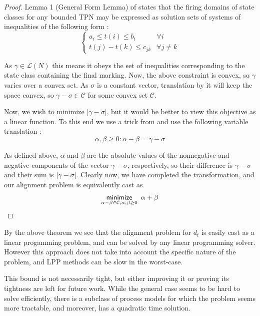 \documentclass[conference]{IEEEtran}
\newcounter{cases}
\begin{document}
\begin{proof}
		Lemma 1 (General Form Lemma) of \cite{berthomieu1982state} states that the firing domains of state classes for any bounded TPN may be expressed as solution sets of systems of inequalities of the following form :  $$\begin{cases}
			a_i \leq t(i) \leq b_i & \forall i \\ 
			t(j) - t(k) \leq c_{jk} & \forall j \neq k
		\end{cases}$$
		
		As $\gamma \in \mathcal{L}(N)$  this means it obeys the set of inequalities corresponding to the state class containing the final marking. Now, the above constraint is convex, so $\gamma$ varies over a convex set. As $\sigma$ is a constant vector, translation by it will keep the space convex, so $\gamma - \sigma \in \mathcal{C}$ for some convex set $\mathcal{C}$. 
		
		Now, we wish to minimize $|\gamma - \sigma|$, but it would be better to view this objective as a linear function. To this end we use a trick from \cite{BV2014} and use the following variable translation : $$\alpha, \beta \geq 0 : \alpha - \beta = \gamma - \sigma$$
		
		As defined above, $\alpha$ and $\beta$ are the absolute values of the nonnegative and negative components of the vector $\gamma - \sigma$, respectively, so their difference is $\gamma - \sigma$ and their sum is $|\gamma - \sigma|$. Clearly now, we have completed the transformation, and our alignment problem is equivalently cast as $$\underset{\alpha - \beta \in \mathcal{C}, \alpha, \beta \geq 0}{\mathsf{minimize}} \hspace{0.5em} \alpha + \beta  $$
		
	\end{proof}

By the above theorem we see that the alignment problem for $d_t$ is easily cast as a linear progamming problem, and can be solved by any linear programming solver. 
However this approach does not take into account the specific nature of the problem, and LPP methods can be slow in the worst-case. 
		
This bound is not necessarily tight, but either improving it or proving its tightness are left for future work. While the general case seems to be hard to solve efficiently, there is a subclass of process models for which the problem seems more tractable, and moreover, has a quadratic time solution. 
\end{document}
